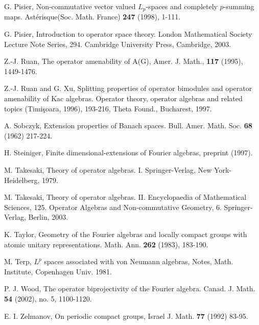\documentclass[10pt]{amsart}
\numberwithin{thm}{section}
\numberwithin{equation}{section}
\begin{document}
\begin{thebibliography}{1}
G. Pisier, Non-commutative vector valued $L_p$-spaces and completely $p$-summing maps. Ast\'{e}risque(Soc. Math. France)
\textbf{247} (1998), 1-111.

G. Pisier, Introduction to operator space theory. London Mathematical Society Lecture Note Series, 294. Cambridge
University Press, Cambridge, 2003.

  Z.-J. Ruan, The operator amenability of A(G), Amer. J.
Math., \textbf{117} (1995), 1449-1476.

Z.-J. Ruan and G. Xu, Splitting properties of operator bimodules and operator amenability of Kac algebras. 
Operator theory, operator algebras and related topics (Timi\c soara, 1996), 193-216, Theta Found., Bucharest, 1997.

A. Sobczyk, Extension properties of Banach spaces. Bull. Amer. Math. Soc. \textbf{68} (1962) 217-224.

H. Steiniger, Finite dimensional-extensions of Fourier algebras, preprint (1997).

M. Takesaki, Theory of operator algebras. I. Springer-Verlag, New York-Heidelberg, 1979.

M. Takesaki, Theory of operator algebras. II. Encyclopaedia of Mathematical Sciences, 125.
Operator Algebras and Non-commutative Geometry, 6. Springer-Verlag, Berlin, 2003.

 K. Taylor, Geometry of the Fourier algebras and locally compact groups with atomic unitary representations.
Math. Ann. \textbf{262} (1983), 183-190.

M. Terp, $L^p$ spaces associated with von Neumann algebras, Notes, Math. Institute, Copenhagen Univ. 1981.

P. J. Wood, The operator biprojectivity of the Fourier algebra. Canad. J. Math. \textbf{54} (2002), no. 5, 1100-1120.

E. I. Zelmanov, On periodic compact groups, Israel J. Math. \textbf{77} (1992) 83-95.

\end{thebibliography}
\end{document}
